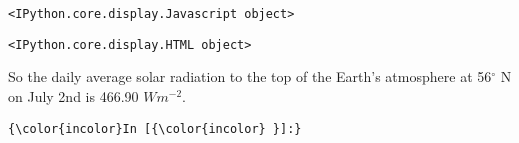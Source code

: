 \documentclass{article}
\begin{document}
    
    \begin{verbatim}
<IPython.core.display.Javascript object>
    \end{verbatim}

    
    
    \begin{verbatim}
<IPython.core.display.HTML object>
    \end{verbatim}

    
    So the daily average solar radiation to the top of the Earth's
atmosphere at 56\(^{\circ}\) N on July 2nd is 466.90 \(W m^{-2}\).

    \begin{Verbatim}[commandchars=\\\{\}]
{\color{incolor}In [{\color{incolor} }]:} 
\end{Verbatim}


    
    
    
    
\end{document}
